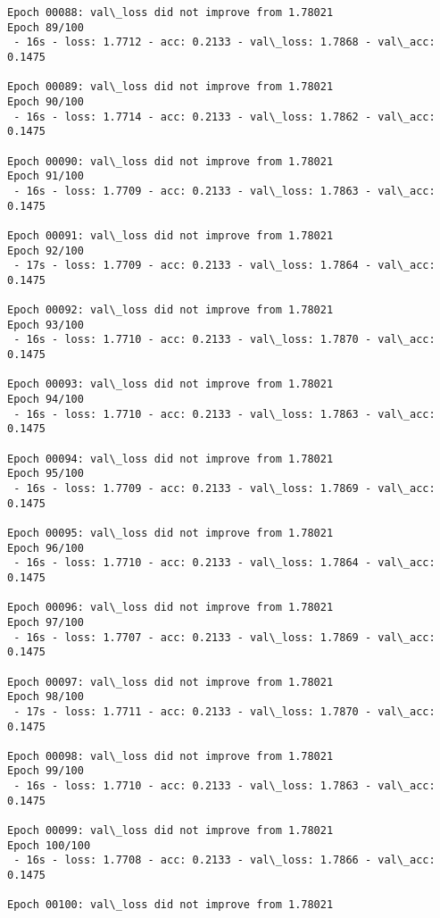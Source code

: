 \documentclass[11pt]{article}
\begin{document}
\begin{Verbatim}[commandchars=\\\{\}]
Epoch 00088: val\_loss did not improve from 1.78021
Epoch 89/100
 - 16s - loss: 1.7712 - acc: 0.2133 - val\_loss: 1.7868 - val\_acc: 0.1475

Epoch 00089: val\_loss did not improve from 1.78021
Epoch 90/100
 - 16s - loss: 1.7714 - acc: 0.2133 - val\_loss: 1.7862 - val\_acc: 0.1475

Epoch 00090: val\_loss did not improve from 1.78021
Epoch 91/100
 - 16s - loss: 1.7709 - acc: 0.2133 - val\_loss: 1.7863 - val\_acc: 0.1475

Epoch 00091: val\_loss did not improve from 1.78021
Epoch 92/100
 - 17s - loss: 1.7709 - acc: 0.2133 - val\_loss: 1.7864 - val\_acc: 0.1475

Epoch 00092: val\_loss did not improve from 1.78021
Epoch 93/100
 - 16s - loss: 1.7710 - acc: 0.2133 - val\_loss: 1.7870 - val\_acc: 0.1475

Epoch 00093: val\_loss did not improve from 1.78021
Epoch 94/100
 - 16s - loss: 1.7710 - acc: 0.2133 - val\_loss: 1.7863 - val\_acc: 0.1475

Epoch 00094: val\_loss did not improve from 1.78021
Epoch 95/100
 - 16s - loss: 1.7709 - acc: 0.2133 - val\_loss: 1.7869 - val\_acc: 0.1475

Epoch 00095: val\_loss did not improve from 1.78021
Epoch 96/100
 - 16s - loss: 1.7710 - acc: 0.2133 - val\_loss: 1.7864 - val\_acc: 0.1475

Epoch 00096: val\_loss did not improve from 1.78021
Epoch 97/100
 - 16s - loss: 1.7707 - acc: 0.2133 - val\_loss: 1.7869 - val\_acc: 0.1475

Epoch 00097: val\_loss did not improve from 1.78021
Epoch 98/100
 - 17s - loss: 1.7711 - acc: 0.2133 - val\_loss: 1.7870 - val\_acc: 0.1475

Epoch 00098: val\_loss did not improve from 1.78021
Epoch 99/100
 - 16s - loss: 1.7710 - acc: 0.2133 - val\_loss: 1.7863 - val\_acc: 0.1475

Epoch 00099: val\_loss did not improve from 1.78021
Epoch 100/100
 - 16s - loss: 1.7708 - acc: 0.2133 - val\_loss: 1.7866 - val\_acc: 0.1475

Epoch 00100: val\_loss did not improve from 1.78021

    \end{Verbatim}
\end{document}
